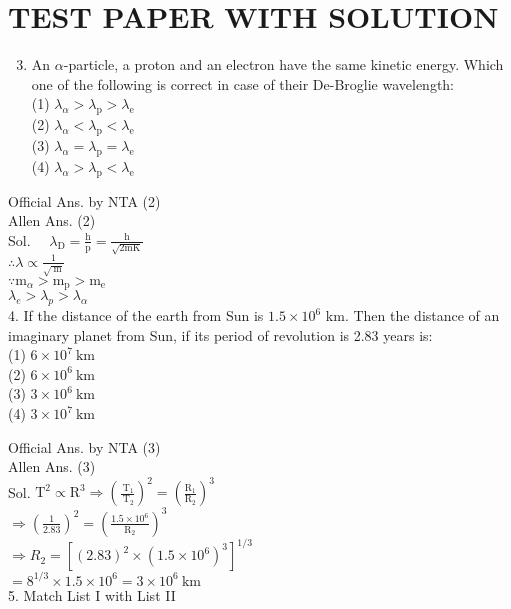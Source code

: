 \documentclass[10pt]{article}
\begin{document}
\section*{TEST PAPER WITH SOLUTION}
\begin{enumerate}
  \setcounter{enumi}{2}
  \item An \(\alpha\)-particle, a proton and an electron have the same kinetic energy. Which one of the following is correct in case of their De-Broglie wavelength:\\
(1) \(\lambda_{\alpha}>\lambda_{\mathrm{p}}>\lambda_{\mathrm{e}}\)\\
(2) \(\lambda_{\alpha}<\lambda_{\mathrm{p}}<\lambda_{\mathrm{e}}\)\\
(3) \(\lambda_{\alpha}=\lambda_{\mathrm{p}}=\lambda_{\mathrm{e}}\)\\
(4) \(\lambda_{\alpha}>\lambda_{\mathrm{p}}<\lambda_{\mathrm{e}}\)
\end{enumerate}

Official Ans. by NTA (2)\\
Allen Ans. (2)\\
Sol. \(\quad \lambda_{\mathrm{D}}=\frac{\mathrm{h}}{\mathrm{p}}=\frac{\mathrm{h}}{\sqrt{2 \mathrm{mK}}}\)\\
\(\therefore \lambda \propto \frac{1}{\sqrt{\mathrm{~m}}}\)\\
\(\because \mathrm{m}_{\alpha}>\mathrm{m}_{\mathrm{p}}>\mathrm{m}_{\mathrm{e}}\)\\
\(\lambda_{e}>\lambda_{p}>\lambda_{\alpha}\)\\
4. If the distance of the earth from Sun is \(1.5 \times 10^{6}\) km. Then the distance of an imaginary planet from Sun, if its period of revolution is 2.83 years is:\\
(1) \(6 \times 10^{7} \mathrm{~km}\)\\
(2) \(6 \times 10^{6} \mathrm{~km}\)\\
(3) \(3 \times 10^{6} \mathrm{~km}\)\\
(4) \(3 \times 10^{7} \mathrm{~km}\)

Official Ans. by NTA (3)\\
Allen Ans. (3)\\
Sol. \(\mathrm{T}^{2} \propto \mathrm{R}^{3} \Rightarrow\left(\frac{\mathrm{~T}_{1}}{\mathrm{~T}_{2}}\right)^{2}=\left(\frac{\mathrm{R}_{1}}{\mathrm{R}_{2}}\right)^{3}\)\\
\(\Rightarrow\left(\frac{1}{2.83}\right)^{2}=\left(\frac{1.5 \times 10^{6}}{\mathrm{R}_{2}}\right)^{3}\)\\
\(\Rightarrow R_{2}=\left[(2.83)^{2} \times\left(1.5 \times 10^{6}\right)^{3}\right]^{1 / 3}\)\\
\(=8^{1 / 3} \times 1.5 \times 10^{6}=3 \times 10^{6} \mathrm{~km}\)\\
5. Match List I with List II
\end{document}
